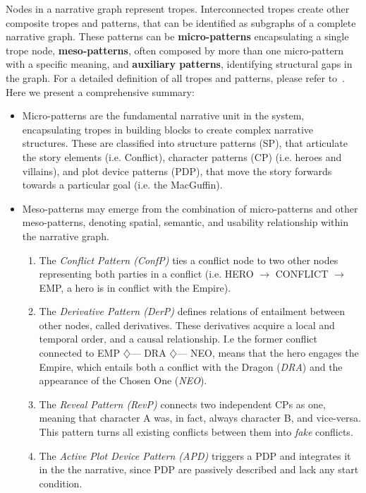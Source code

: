 Nodes in a narrative graph represent tropes. Interconnected tropes create other composite tropes and patterns, that can be identified as subgraphs of a complete narrative graph. These patterns can be \textbf{micro-patterns} encapsulating a single trope node, \textbf{meso-patterns}, often composed by more than one micro-pattern with a specific meaning, and \textbf{auxiliary patterns}, identifying structural gaps in the graph. For a detailed definition of all tropes and patterns, please refer to~. Here we present a comprehensive summary:

\begin{itemize}
    \item Micro-patterns are the fundamental narrative unit in the system, encapsulating tropes in building blocks to create complex narrative structures. These are classified into structure patterns (SP), that articulate the story elements (i.e. Conflict), character patterns (CP) (i.e. heroes and villains), and plot device patterns (PDP), that move the story forwards towards a particular goal (i.e. the MacGuffin).
    \item Meso-patterns may emerge from the combination of micro-patterns and other meso-patterns, denoting spatial, semantic, and usability relationship within the narrative graph.
    \begin{enumerate}
        \item The \emph{Conflict Pattern (ConfP)} ties a conflict node to two other nodes representing both parties in a conflict (i.e. HERO $\rightarrow$ CONFLICT $\rightarrow$ EMP, a hero is in conflict with the Empire).
        \item The \emph{Derivative Pattern (DerP)} defines relations of entailment between other nodes, called derivatives. These derivatives acquire a local and temporal order, and a causal relationship. I.e the former conflict connected to EMP $\diamondsuit$--- DRA $\diamondsuit$--- NEO, means that the hero engages the Empire, which entails both a conflict with the Dragon (\emph{DRA}) and the appearance of the Chosen One (\emph{NEO}).
        \item The \emph{Reveal Pattern (RevP)} connects two independent CPs as one, meaning that character A was, in fact, always character B, and vice-versa. This pattern turns all existing conflicts between them into \emph{fake} conflicts.
        \item The \emph{Active Plot Device Pattern (APD)} triggers a PDP and integrates it in the the narrative, since PDP are passively described and lack any start condition.

\end{enumerate}
\end{itemize}
